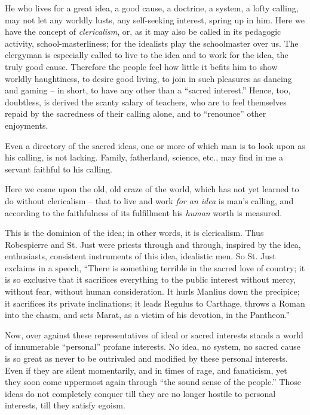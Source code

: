 \documentclass[12pt,a4paper]{book}
\begin{document}
He who lives for a great idea, a good cause, a doctrine, a system, a lofty 
calling, may not let any worldly lusts, any self-seeking interest, spring up 
in him. Here we have the concept of \textit{clericalism}, or, as it may also 
be called in its pedagogic activity, school-masterliness; for the idealists 
play the schoolmaster over us. The clergyman is especially called to live to 
the idea and to work for the idea, the truly good cause. Therefore the people 
feel how little it befits him to show worldly haughtiness, to desire good 
living, to join in such pleasures as dancing and gaming -- in short, to have 
any other than a ``sacred interest.'' Hence, too, doubtless, is derived the 
scanty salary of teachers, who are to feel themselves repaid by the sacredness 
of their calling alone, and to ``renounce'' other enjoyments.

Even a directory of the sacred ideas, one or more of which man is to look upon 
as his calling, is not lacking. Family, fatherland, science, etc., may find in 
me a servant faithful to his calling.

Here we come upon the old, old craze of the world, which has not yet learned 
to do without clericalism -- that to live and work \textit{for an idea} is 
man's calling, and according to the faithfulness of its fulfillment his 
\textit{human} worth is measured.

This is the dominion of the idea; in other words, it is clericalism. Thus 
Robespierre and St. Just were priests through and through, inspired by the 
idea, enthusiasts, consistent instruments of this idea, idealistic men. So St. 
Just exclaims in a speech, ``There is something terrible in the sacred love 
of country; it is so exclusive that it sacrifices everything to the public 
interest without mercy, without fear, without human consideration. It hurls 
Manlius down the precipice; it sacrifices its private inclinations; it leads 
Regulus to Carthage, throws a Roman into the chasm, and sets Marat, as a 
victim of his devotion, in the Pantheon.''

Now, over against these representatives of ideal or sacred interests stands a 
world of innumerable ``personal'' profane interests. No idea, no system, no 
sacred cause is so great as never to be outrivaled and modified by these 
personal interests. Even if they are silent momentarily, and in times of rage, 
and fanaticism, yet they soon come uppermost again through ``the sound sense 
of the people.'' Those ideas do not completely conquer till they are no 
longer hostile to personal interests, till they satisfy egoism.
\end{document}
